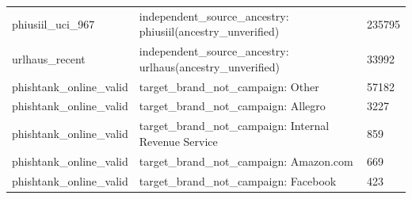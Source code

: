 \begin{tabular}{lll}
phiusiil\_uci\_967 & independent\_source\_ancestry: phiusiil(ancestry\_unverified) & 235795 \\
urlhaus\_recent & independent\_source\_ancestry: urlhaus(ancestry\_unverified) & 33992 \\
phishtank\_online\_valid & target\_brand\_not\_campaign: Other & 57182 \\
phishtank\_online\_valid & target\_brand\_not\_campaign: Allegro & 3227 \\
phishtank\_online\_valid & target\_brand\_not\_campaign: Internal Revenue Service & 859 \\
phishtank\_online\_valid & target\_brand\_not\_campaign: Amazon.com & 669 \\
phishtank\_online\_valid & target\_brand\_not\_campaign: Facebook & 423 \\
\end{tabular}
